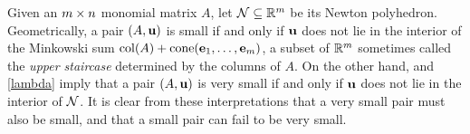 \documentclass[11pt]{amsart}
\begin{document}
\begin{remark}
\label{geometric small and very small: R}
Given an $m \times n$ monomial matrix $A$, let $\mathcal{N} \subseteq \mathbb{R}^{m}$ be its Newton polyhedron.
Geometrically, a pair $(A, \mathbf{u})$ is small if and only if $\mathbf{u}$ does not lie in the interior of the Minkowski sum $\operatorname{col}(A) + \operatorname{cone}(\mathbf{e}_1,\ldots,\mathbf{e}_m)$, a subset of $\mathbb{R}^{m}$ sometimes called the \emph{upper staircase} determined by the columns of $A$. 
On the other hand,  and \eqref{lambda} imply that a pair $(A, \mathbf{u})$ is very small if and only if $\mathbf{u}$ does not lie in the interior of $\mathcal{N}$.
It is clear from these interpretations that a very small pair must also be small, and that a small pair can fail to be very small.  %
\end{remark}
\end{document}
